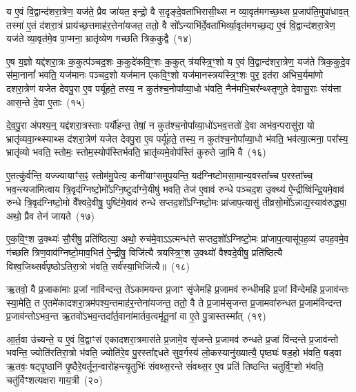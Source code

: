 य ए॒वं वि॒द्वान्द॑शरा॒त्रेण॒ यज॑ते॒ प्रैव जा॑यत॒ इन्द्रो॒ वै स॒दृङ्दे॒वता॑भिरासी॒थ्स न व्या॒वृत॑मगच्छ॒थ्स प्र॒जा\-प॑ति॒मुपा॑धाव॒त् तस्मा॑ ए॒तं द॑शरा॒त्रं प्राय॑च्छ॒त्तमाह॑र॒त्तेना॑यजत॒ ततो॒ वै सो᳚\-ऽन्याभि॑र्दे॒वता॑भिर्व्या॒वृत॑मगच्छ॒द्य ए॒वं वि॒द्वान्द॑शरा॒त्रेण॒ यज॑ते व्या॒वृत॑मे॒व पा॒प्मना॒ भ्रातृ॑व्येण गच्छति त्रिक॒कुद्वै~(१४)\ip

ए॒ष य॒ज्ञो यद्द॑शरा॒त्रः क॒कुत्प॑ञ्चद॒शः क॒कुदे॑कवि॒ꣳ॒शः क॒कुत् त्र॑यस्त्रि॒ꣳ॒शो य ए॒वं वि॒द्वान्द॑शरा॒त्रेण॒ यज॑ते त्रिक॒कुदे॒व स॑मा॒नानां᳚ भवति॒ यज॑मानः पञ्चद॒शो यज॑मान एकवि॒ꣳ॒शो यज॑मानस्त्रयस्त्रि॒ꣳ॒शः पुर॒ इत॑रा अभिच॒र्यमा॑णो दशरा॒त्रेण॑ यजेत देवपु॒रा ए॒व पर्यू॑हते॒ तस्य॒ न कुत॑श्च॒नोपा᳚व्या॒धो भ॑वति॒ नैन॑मभि॒चर᳚न्थ्स्तृणुते देवासु॒राः संय॑त्ता आस॒न्ते दे॒वा ए॒ताः~(१५)\ip

दे॒व॒पु॒रा अ॑पश्य॒न्॒ यद्द॑शरा॒त्रस्ताः पर्यौ॑हन्त॒ तेषां॒ न कुत॑श्च॒नोपा᳚व्या॒धो॑\-ऽभव॒त्ततो॑ दे॒वा अभ॑व॒न्परासु॑रा॒ यो भ्रातृ॑व्यवा॒न्थ्स्याथ्स द॑शरा॒त्रेण॑ यजेत देवपु॒रा ए॒व पर्यू॑हते॒ तस्य॒ न कुत॑श्च॒नोपा᳚व्या॒धो भ॑वति॒ भव॑त्या॒त्मना॒ परा᳚स्य॒ भ्रातृ॑व्यो भवति॒ स्तोमः॒ स्तोम॒स्योप॑स्तिर्भवति॒ भ्रातृ॑व्यमे॒वोप॑स्तिं कुरुते जा॒मि वै~(१६)\ip

ए॒तत्कु॑र्वन्ति॒ यज्ज्यायाꣳ॑स॒ꣴ॒ स्तोम॑मु॒पेत्य॒ कनी॑याꣳसमुप॒यन्ति॒ यद॑ग्निष्टोमसा॒मान्य॒वस्ता᳚च्च प॒रस्ता᳚च्च॒ भव॒न्त्यजा॑मित्वाय त्रि॒वृद॑ग्निष्टो॒मो᳚\-ऽग्नि॒ष्टुदा᳚ग्ने॒यीषु॑ भवति॒ तेज॑ ए॒वाव॑ रुन्धे पञ्चद॒श उ॒क्थ्य॑ ऐ॒न्द्रीष्वि॑न्द्रि॒यमे॒वाव॑ रुन्धे त्रि॒वृद॑ग्निष्टो॒मो वै᳚श्वदे॒वीषु॒ पुष्टि॑मे॒वाव॑ रुन्धे सप्तद॒शो᳚\-ऽग्निष्टो॒मः प्रा॑जाप॒त्यासु॑ तीव्रसो॒मो᳚\-ऽन्नाद्य॒स्याव॑रुद्ध्या॒ अथो॒ प्रैव तेन॑ जायते~(१७)\ip

ए॒क॒वि॒ꣳ॒श उ॒क्थ्यः॑ सौ॒रीषु॒ प्रति॑ष्ठित्या॒ अथो॒ रुच॑मे॒वा\-ऽऽ\-त्मन्ध॑त्ते सप्तद॒शो᳚\-ऽग्निष्टो॒मः प्रा॑जाप॒त्यासू॑पह॒व्य॑ उपह॒वमे॒व ग॑च्छति त्रिण॒वाव॑ग्निष्टो॒माव॒भित॑ ऐ॒न्द्रीषु॒ विजि॑त्यै त्रयस्त्रि॒ꣳ॒श उ॒क्थ्यो॑ वैश्वदे॒वीषु॒ प्रति॑ष्ठित्यै विश्व॒जिथ्सर्व॑पृष्ठो\-ऽतिरा॒त्रो भ॑वति॒ सर्व॑स्या॒भिजि॑त्यै॥~(१८)\ip

{\anuvakamend[{प्रा॒जा॒प॒त्यो वा ए॒ष य॒ज्ञो यद्द॑शरा॒त्रस्त्रि॑क॒कुद्वा ए॒ता वै जा॑यत॒ एक॑त्रिꣳशच्च}]}

ऋ॒तवो॒ वै प्र॒जाका॑माः प्र॒जां नावि॑न्दन्त॒ ते॑\-ऽकामयन्त प्र॒जाꣳ सृ॑जेमहि प्र॒जामव॑ रुन्धीमहि प्र॒जां वि॑न्देमहि प्र॒जाव॑न्तः स्या॒मेति॒ त ए॒तमे॑कादशरा॒त्रम॑पश्य॒न्तमाह॑र॒न्तेना॑यजन्त॒ ततो॒ वै ते प्र॒जाम॑सृजन्त प्र॒जामवा॑रुन्धत प्र॒जाम॑विन्दन्त प्र॒जाव॑न्तो\-ऽभव॒न्त ऋ॒तवो॑\-ऽभव॒न्तदा᳚र्त॒वाना॑मार्तव॒त्वमृ॑तू॒नां वा ए॒ते पु॒त्रास्तस्मा᳚त्~(१९)\ip

आ॒र्त॒वा उ॑च्यन्ते॒ य ए॒वं वि॒द्वाꣳस॑ एकादशरा॒त्रमास॑ते प्र॒जामे॒व सृ॑जन्ते प्र॒जामव॑ रुन्धते प्र॒जां वि॑न्दन्ते प्र॒जाव॑न्तो भवन्ति॒ ज्योति॑रतिरा॒त्रो भ॑वति॒ ज्योति॑रे॒व पु॒रस्ता᳚द्दधते सुव॒र्गस्य॑ लो॒कस्यानु॑ख्यात्यै॒ पृष्ठ्यः॑ षड॒हो भ॑वति॒ षड्वा ऋ॒तवः॒ षट्पृ॒ष्ठानि॑ पृ॒ष्ठैरे॒वर्तून॒न्वारो॑हन्त्यृ॒तुभिः॑ संवथ्स॒रन्ते सं॑वथ्स॒र ए॒व प्रति॑ तिष्ठन्ति चतुर्वि॒ꣳ॒शो भ॑वति॒ चतु॑र्विꣳशत्यक्षरा गाय॒त्री~(२०)\ip


